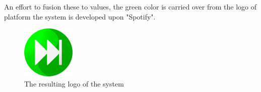 An effort to fusion these to values, the green color is carried over from the logo of platform the system is developed upon "Spotify".

\begin{figure}
  \centering
  \includegraphics[width=0.5\linewidth]{Images/Icon.png}
  \caption{The resulting logo of the system}
  \label{fig:logo}
\end{figure}